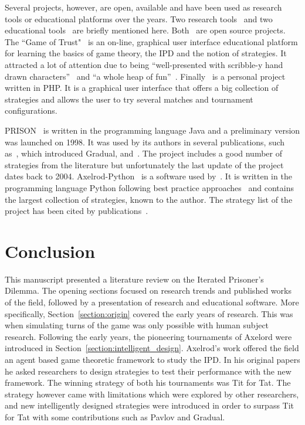Several projects, however, are open, available and have been used as research
tools or educational platforms over the years. Two research tools~\cite{prison,
axelrodproject} and two educational tools~\cite{pd_trust, pd_game} are briefly
mentioned here. Both~\cite{prison, axelrodproject} are open
source projects.
The ``Game of Trust"~\cite{pd_trust} is an on-line, graphical user interface
educational platform for learning the basics of game theory, the IPD
and the notion of strategies. It attracted a lot of attention
due to being ``well-presented with scribble-y hand drawn
characters''~\cite{trust_blogb} and ``a whole heap of fun''~\cite{trust_bloga}.
Finally~\cite{pd_game} is a personal project written in PHP. It is a graphical user
interface that offers a big collection of strategies and allows the user to try
several matches and tournament configurations.

PRISON~\cite{prison} is written in the programming
language Java and a preliminary version was launched on 1998. It was used by its
authors in several publications, such as~\cite{Beaufils1997}, which introduced
Gradual, and~\cite{Beaufils1988}. The project includes a good number of
strategies from the literature but unfortunately the last update of the project
dates back to 2004. Axelrod-Python~\cite{axelrodproject} is a software used
by~\cite{Knight2017,KnightHGC17, Goodman2018, Wang2017}. It is written in the
programming language Python following best practice approaches~\cite{Aberdour2007,
Benureau2018} and contains the
largest collection of strategies, known to the author. The strategy list of
the project has been cited by publications~\cite{Anastassacos2018, Hayes2017,
Neumann2018}.

\section{Conclusion}

This manuscript presented a literature review on the Iterated Prisoner's
Dilemma. The opening sections focused on research trends and published works of
the field, followed by a presentation of research and educational software.
More specifically, Section~\ref{section:origin}
covered the early years of research. This was when simulating turns of the game
was only possible with human subject research.
Following the early years, the pioneering tournaments of Axelord were introduced in
Section~\ref{section:intelligent_design}. Axelrod's work offered the field an
agent based game theoretic framework to study the IPD.
In his original papers he asked researchers to design strategies to test their
performance with the new framework. The winning strategy of both his tournaments
was Tit for Tat. The strategy however came with limitations which were explored
by other researchers, and new intelligently designed strategies were introduced in
order to surpass Tit for Tat with some contributions such as Pavlov and Gradual.

